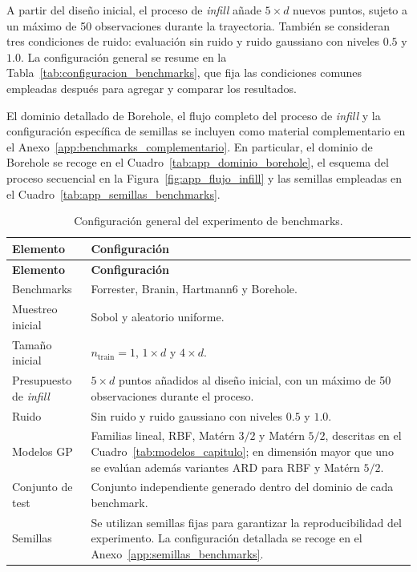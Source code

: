 A partir del diseño inicial, el proceso de \emph{infill} añade \(5 \times d\) nuevos puntos, sujeto a un máximo de 50 observaciones durante la trayectoria. También se consideran tres condiciones de ruido: evaluación sin ruido y ruido gaussiano con niveles \(0.5\) y \(1.0\). La configuración general se resume en la Tabla~\ref{tab:configuracion_benchmarks}, que fija las condiciones comunes empleadas después para agregar y comparar los resultados.

El dominio detallado de Borehole, el flujo completo del proceso de \emph{infill} y la configuración específica de semillas se incluyen como material complementario en el Anexo~\ref{app:benchmarks_complementario}. En particular, el dominio de Borehole se recoge en el Cuadro~\ref{tab:app_dominio_borehole}, el esquema del proceso secuencial en la Figura~\ref{fig:app_flujo_infill} y las semillas empleadas en el Cuadro~\ref{tab:app_semillas_benchmarks}.

\protect{}\label{tab:configuracion_benchmarks}
\begin{longtable}[]{@{}ll@{}}
\caption{Configuración general del experimento de benchmarks.}\tabularnewline
\toprule\noalign{}
\textbf{Elemento} & \textbf{Configuración} \\
\midrule\noalign{}
\endfirsthead
\toprule\noalign{}
\textbf{Elemento} & \textbf{Configuración} \\
\midrule\noalign{}
\endhead
\bottomrule\noalign{}
\endlastfoot
Benchmarks & Forrester, Branin, Hartmann6 y Borehole. \\
Muestreo inicial & Sobol y aleatorio uniforme. \\
Tamaño inicial & \(n_{\text{train}} = 1\), \(1 \times d\) y \(4 \times d\). \\
Presupuesto de \emph{infill} & \(5 \times d\) puntos añadidos al diseño inicial, con un máximo de 50 observaciones durante el proceso. \\
Ruido & Sin ruido y ruido gaussiano con niveles \(0.5\) y \(1.0\). \\
Modelos GP & Familias lineal, RBF, Matérn \(3/2\) y Matérn \(5/2\), descritas en el Cuadro~\ref{tab:modelos_capitulo}; en dimensión mayor que uno se evalúan además variantes ARD para RBF y Matérn \(5/2\). \\
Conjunto de test & Conjunto independiente generado dentro del dominio de cada benchmark. \\
Semillas & Se utilizan semillas fijas para garantizar la reproducibilidad del experimento. La configuración detallada se recoge en el Anexo~\ref{app:semillas_benchmarks}. \\
\end{longtable}

